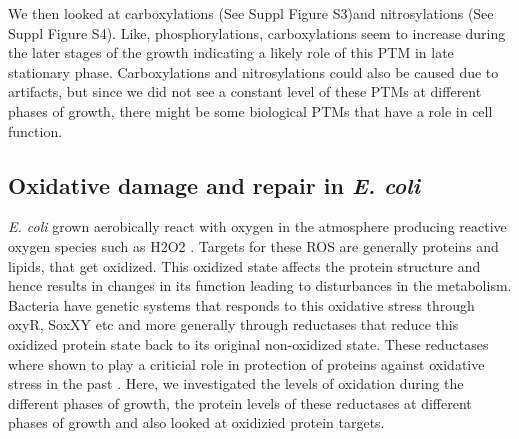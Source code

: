 \documentclass[12pt]{article}
\begin{document}
We then looked at carboxylations (See Suppl Figure S3)and nitrosylations (See Suppl Figure S4). Like, phosphorylations, carboxylations seem to increase during the later stages of the growth indicating a likely role of this PTM in late stationary phase. Carboxylations and nitrosylations could also be caused due to artifacts, but since we did not see a constant level of these PTMs at different phases of growth, there might be some biological PTMs that have a role in cell function. 

\subsection{Oxidative damage and repair in \emph{E. coli}}
%
%   
%   
%   
%

\emph{E. coli} grown aerobically react with oxygen in the atmosphere producing reactive oxygen species such as H2O2 \cite{GonzalezDemple1995}. Targets for these ROS are generally proteins and lipids, that get oxidized. This oxidized state affects the protein structure and hence results in changes in its function leading to disturbances in the metabolism. Bacteria have genetic systems that responds to this oxidative stress through oxyR, SoxXY etc and more generally through reductases that reduce this oxidized protein state back to its original non-oxidized state. These reductases where shown to play a criticial role in protection of proteins against oxidative stress in the past \cite{Vogt1995}. Here, we investigated the levels of oxidation during the different phases of growth, the protein levels of these reductases at different phases of growth and also looked at oxidizied protein targets.
\end{document}
